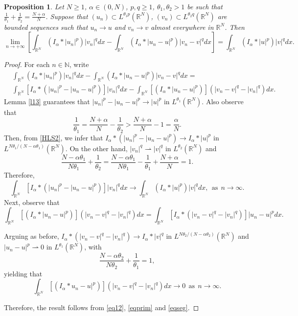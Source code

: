 \documentclass[12pt,a4paper]{article}
\newtheorem{proposition}[theorem]{Proposition}
\numberwithin{equation}{section}
\begin{document}
\begin{proposition}\label{l14}
Let $N \geq 1$, $\alpha \in (0, N)$, $p, q \geq 1$, $\theta_1, \theta_2>1$ be such that $\frac{1}{\theta_1}+ \frac{1}{\theta_2} = \frac{N+\alpha}{N}$. Suppose that $(u_n) \subset L^{\theta_1p}(\mathbb{R}^N)$, $(v_n) \subset L^{\theta_2q}(\mathbb{R}^N)$ are bounded sequences such that $u_n \to u$ and $v_n \to v$ almost everywhere in $\mathbb{R}^N$. Then
$$
\lim\limits_{n\rightarrow +\infty} \left[\int_{\mathbb{R}^N} (I_\alpha \ast |u_{n}|^p)|v_{n}|^q dx - \int_{\mathbb{R}^N} (I_\alpha \ast |u_{n} -u|^p)|v_{n} -v|^q dx \right] = \int_{\mathbb{R}^N} (I_\alpha \ast |u|^p)|v|^q dx.
$$
\end{proposition}
\begin{proof}
For each $n\in \mathbb{N}$, write
\begin{align}\label{eq12}
& \int_{\mathbb{R}^N} (I_\alpha \ast |u_{n}|^p)|v_{n}|^q dx - \int_{\mathbb{R}^N} (I_\alpha \ast |u_{n} -u|^p)|v_{n} -v|^q dx = \\ \nonumber
& \int_{\mathbb{R}^N} [I_\alpha \ast (|u_{n}|^p - |u_{n} -u|^p)]|v_{n}|^q dx - \int_{\mathbb{R}^N} [(I_\alpha \ast |u_{n} -u|^p)](|v_{n} -v|^q -|v_{n}|^q) dx.
\end{align}
Lemma \ref{l13} guarantees that $|u_{n}|^p - |u_{n} - u|^p \to |u|^p$ in $L^{\theta_1}(\mathbb{R}^N)$. Also observe that 
$$\frac{1}{\theta_1} = \frac{N+\alpha}{N} - \frac{1}{\theta_2}> \frac{N+\alpha}{N} - 1 = \frac{\alpha}{N}.$$
Then, from \eqref{HLS2}, we infer that $I_\alpha \ast (|u_{n}|^p - |u_{n} -u|^p) \to I_{\alpha}\ast |u|^p$ in $L^{N\theta_1/(N - \alpha\theta_1)}(\mathbb{R}^N)$. On the other hand, $|v_{n}|^q \rightharpoonup |v|^q$ in $L^{\theta_2}(\mathbb{R}^N)$ and
$$
\frac{N-\alpha\theta_1}{N \theta_1} + \frac{1}{\theta_2} = \frac{N-\alpha\theta_1}{N \theta_1} - \frac{1}{\theta_1} + \frac{N+\alpha}{N} =1.
$$
Therefore,
\begin{equation}\label{eqprim}
\int_{\mathbb{R}^N} [I_\alpha \ast (|u_{n}|^p - |u_{n} -u|^p )]|v_{n}|^q dx \to  \int_{\mathbb{R}^N} (I_\alpha \ast |u|^p)|v|^q dx, \ \ \text{as} \ \ n \to \infty.
\end{equation}
Next, observe that
\[
\int_{\mathbb{R}^N} [(I_\alpha \ast |u_{n} -u|^p)](|v_{n} -v|^q -|v_{n}|^q) dx = \int_{\mathbb{R}^N} [I_\alpha \ast (|v_{n} -v|^q -|v_{n}|^q)] |u_{n} -u|^pdx.
\]

Arguing as before, $I_\alpha \ast (|v_{n} -v|^q -|v_{n}|^q) \to I_{\alpha}\ast |v|^q$ in $L^{N\theta_2/(N-\alpha \theta_2)}(\mathbb{R}^N)$ and $|u_n-u|^p \rightharpoonup 0$ in $L^{\theta_1}(\mathbb{R}^N)$, with
\[
\frac{N-\alpha\theta_2}{N \theta_2} + \frac{1}{\theta_1} = 1,
\]
yielding that
\begin{equation}\label{eqseg}
\int_{\mathbb{R}^N} [(I_\alpha \ast u_{n} -u|^p)](|v_{n} -v|^q -|v_{n}|^q) dx  \to 0 \ \ \text{as} \ \ n \to \infty.
\end{equation}

Therefore, the result follows from \eqref{eq12}, \eqref{eqprim} and \eqref{eqseg}.
\end{proof}
\end{document}
